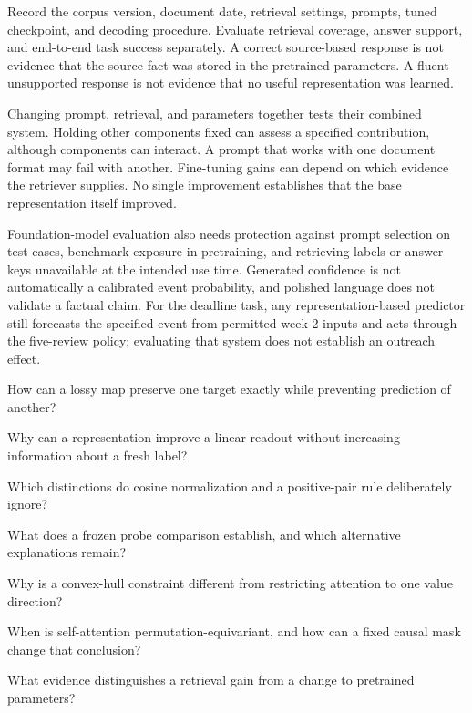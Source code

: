 Record the corpus version, document date, retrieval settings, prompts, tuned checkpoint, and decoding procedure. Evaluate retrieval coverage, answer support, and end-to-end task success separately. A correct source-based response is not evidence that the source fact was stored in the pretrained parameters. A fluent unsupported response is not evidence that no useful representation was learned.

Changing prompt, retrieval, and parameters together tests their combined system. Holding other components fixed can assess a specified contribution, although components can interact. A prompt that works with one document format may fail with another. Fine-tuning gains can depend on which evidence the retriever supplies. No single improvement establishes that the base representation itself improved.

Foundation-model evaluation also needs protection against prompt selection on test cases, benchmark exposure in pretraining, and retrieving labels or answer keys unavailable at the intended use time. Generated confidence is not automatically a calibrated event probability, and polished language does not validate a factual claim. For the deadline task, any representation-based predictor still forecasts the specified event from permitted week-2 inputs and acts through the five-review policy; evaluating that system does not establish an outreach effect.

\begin{studyquestions}
\item How can a lossy map preserve one target exactly while preventing prediction of another?
\item Why can a representation improve a linear readout without increasing information about a fresh label?
\item Which distinctions do cosine normalization and a positive-pair rule deliberately ignore?
\item What does a frozen probe comparison establish, and which alternative explanations remain?
\item Why is a convex-hull constraint different from restricting attention to one value direction?
\item When is self-attention permutation-equivariant, and how can a fixed causal mask change that conclusion?
\item What evidence distinguishes a retrieval gain from a change to pretrained parameters?
\end{studyquestions}

